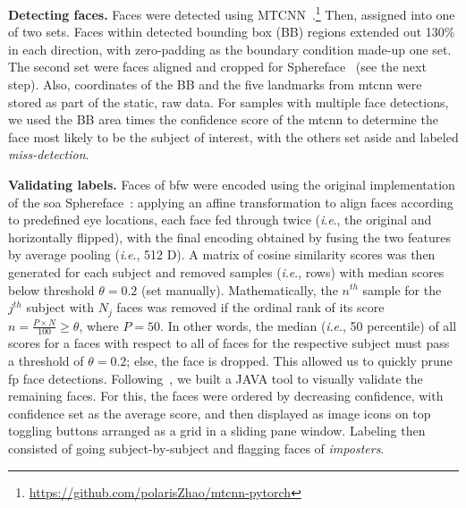 \documentclass[10pt,twocolumn,letterpaper]{article}
\newcommand{\ie}{\textit{i}.\textit{e}., }
\begin{document}
\vspace{1mm}
\noindent\textbf{Detecting faces.} Faces were detected using MTCNN~\cite{zhang2016joint}.\footnote{\href{https://github.com/polarisZhao/mtcnn-pytorch}{https://github.com/polarisZhao/mtcnn-pytorch}} Then, assigned into one of two sets. Faces within detected bounding box (BB) regions extended out 130\% in each direction, with zero-padding as the boundary condition made-up one set. The second set were faces aligned and cropped for Sphereface~\cite{liu2017sphereface} (see the next step). Also, coordinates of the BB and the five landmarks from \gls{mtcnn} were stored as part of the static, raw data. For samples with multiple face detections, we used the BB area times the confidence score of the \gls{mtcnn} to determine the face most likely to be the subject of interest, with the others set aside and labeled \textit{miss-detection}. 



\vspace{1mm}
\noindent\textbf{Validating labels.} 
Faces of \gls{bfw} were encoded using the original implementation of the \gls{soa} Sphereface~\cite{liu2017sphereface}: applying an affine transformation to align faces according to predefined eye locations, each face fed through twice (\ie the original and horizontally flipped), with the final encoding obtained by fusing the two features by average pooling (\ie 512 D). A matrix of cosine similarity scores was then generated for each subject and removed samples (\ie rows) with median scores below threshold $\theta=0.2$ (set manually). Mathematically, the $n^{th}$ sample for the $j^{th}$ subject with $N_j$ faces was removed if the ordinal rank of its score $n = \frac{P\times N}{100}\geq\theta$, where $P=50$. In other words, the median (\ie 50 percentile) of all scores for a faces with respect to all of faces for the respective subject must pass a threshold of $\theta=0.2$; else, the face is dropped. This allowed us to quickly prune \gls{fp} face detections. Following~\cite{robinson2016families, robinson2018visual}, we built a JAVA tool to visually validate the remaining faces. For this, the faces were ordered by decreasing confidence, with confidence set as the average score, and then displayed as image icons on top toggling buttons arranged as a grid in a sliding pane window. Labeling then consisted of going subject-by-subject and flagging faces of \emph{imposters}.
\end{document}
